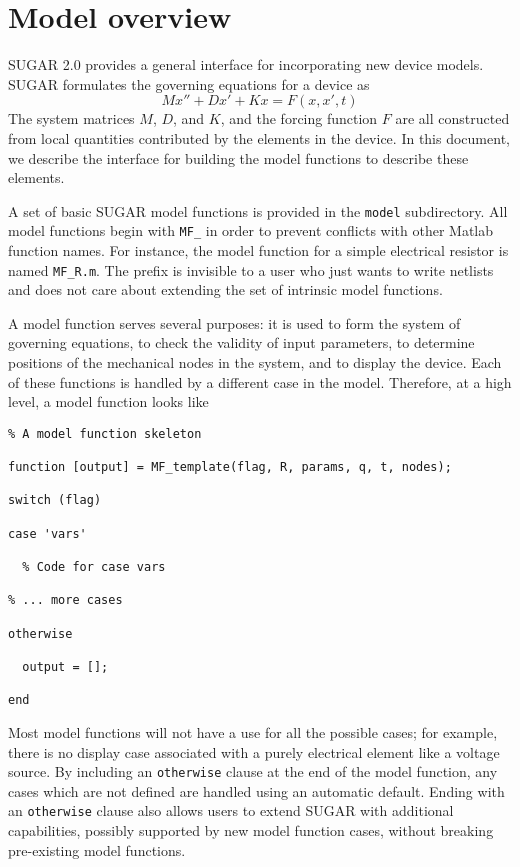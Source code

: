 


\section{Model overview}

SUGAR 2.0 provides a general interface for incorporating new device
models.  
SUGAR formulates the governing equations for a device as
\[
  M x'' + D x' + K x = F(x, x', t)
\]
The system matrices $M$, $D$, and $K$, and the forcing function $F$
are all constructed from local quantities contributed by the elements
in the device.  In this document, we describe the interface for building
the model functions to describe these elements.

A set of basic SUGAR model functions is provided in the \texttt{model}
subdirectory.  All model functions begin with \texttt{MF\_} in order
to prevent conflicts with other Matlab function names.  For instance,
the model function for a simple electrical resistor is named
\texttt{MF\_R.m}.  The prefix is invisible to a user who just wants
to write netlists and does not care about extending the set of intrinsic
model functions.

A model function serves several purposes: 
it is used to form the system of governing equations,
to check the validity of input parameters,
to determine positions of the mechanical nodes in the system,
and to display the device.
Each of these functions is handled by a different case
in the model.  Therefore, at a high level, a model function looks
like
\begin{verbatim}
% A model function skeleton

function [output] = MF_template(flag, R, params, q, t, nodes);

switch (flag)

case 'vars'

  % Code for case vars

% ... more cases

otherwise

  output = [];

end
\end{verbatim}

Most model functions will not have a use for all the possible cases;
for example, there is no display case associated with a purely electrical
element like a voltage source.  By including an \texttt{otherwise} clause
at the end of the model function, any cases which are not defined are
handled using an automatic default.  Ending with an \texttt{otherwise}
clause also allows users to extend SUGAR with additional capabilities,
possibly supported by new model function cases, without breaking pre-existing
model functions.

